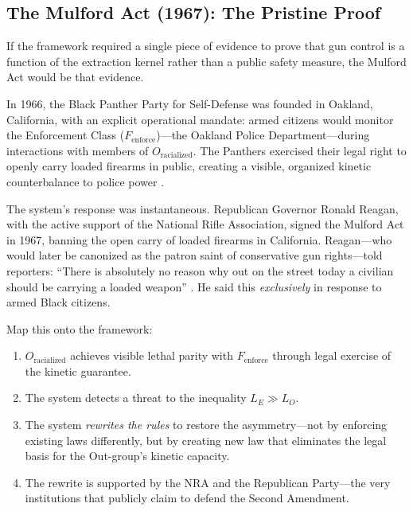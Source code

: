 \documentclass[12pt,openany]{book}
\begin{document}
\FloatBarrier

\subsection{The Mulford Act (1967): The Pristine Proof}
\label{sec:mulford}

If the framework required a single piece of evidence to prove that gun control is a function of the extraction kernel rather than a public safety measure, the Mulford Act would be that evidence.

In 1966, the Black Panther Party for Self-Defense was founded in Oakland, California, with an explicit operational mandate: armed citizens would monitor the Enforcement Class ($F_{\text{enforce}}$)---the Oakland Police Department---during interactions with members of $O_{\text{racialized}}$. The Panthers exercised their legal right to openly carry loaded firearms in public, creating a visible, organized kinetic counterbalance to police power \cite{bloom2013, mulford1967}.

The system's response was instantaneous. Republican Governor Ronald Reagan, with the active support of the National Rifle Association, signed the Mulford Act in 1967, banning the open carry of loaded firearms in California. Reagan---who would later be canonized as the patron saint of conservative gun rights---told reporters: ``There is absolutely no reason why out on the street today a civilian should be carrying a loaded weapon'' \cite{winkler2011}. He said this \textit{exclusively} in response to armed Black citizens.

Map this onto the framework:

\begin{enumerate}
    \item $O_{\text{racialized}}$ achieves visible lethal parity with $F_{\text{enforce}}$ through legal exercise of the kinetic guarantee.
    \item The system detects a threat to the inequality $L_E \gg L_O$.
    \item The system \textit{rewrites the rules} to restore the asymmetry---not by enforcing existing laws differently, but by creating new law that eliminates the legal basis for the Out-group's kinetic capacity.
    \item The rewrite is supported by the NRA and the Republican Party---the very institutions that publicly claim to defend the Second Amendment.
\end{enumerate}
\end{document}
